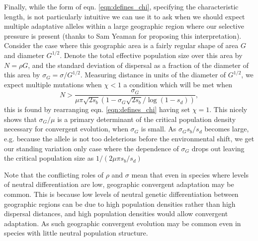 \documentclass{article}
\begin{document}
Finally, while the form of eqn. \eqref{eqn:defines_chi}, specifying
the characteristic length, is not
particularly intuitive we can use it to ask when we should expect
multiple adaptative alleles within a large geographic region  where our selective pressure
is present (thanks to Sam Yeaman for proposing this
interpretation). Consider the case where this geographic area is a fairly regular
shape of area $G$ and diameter $G^{1/2}$. Denote the total effective population size
over this area by $N = \rho G$, and the standard deviation of dispersal as a
fraction of the diameter of this area by $\sigma_G  = \sigma/
G^{1/2}$. Measuring distance in units of the diameter of $G^{1/2}$,
we expect multiple mutations when $\chi<1$ a
condition which will be met when 
\begin{equation}
N > \frac{\sigma_G}{ \mu \pi \sqrt{2s_b} \left(1 -  \sigma_G \sqrt{2s_b} /\log (1-s_d) \right)},
\end{equation}
this is found by rearranging eqn. \eqref{eqn:defines_chi} having set
$\chi=1$. This nicely shows that $\sigma_G/\mu$ is a primary
determinant of the critical population density necessary for
convergent evolution, when $\sigma_G$ is small. As $\sigma_G
s_b/s_d$ becomes large, e.g. because the allele is not too deleterious
before the environmental shift, we get our standing variation only
case where the dependence of  $\sigma_G$
drops out leaving the critical population size as $1/(2 \mu \pi
s_b/s_d)$

Note that the conflicting roles of $\rho$ and $\sigma$ mean that even in
species where levels of neutral differentiation are low, geographic
convergent adaptation may be common. This is because low levels of
neutral genetic differentiation between geographic regions can be due to high population
densities rather than high dispersal distances, and high population
densities would allow convergent adaptation. As such geographic convergent
evolution may be common even in species with little neutral population structure.





\end{document}
